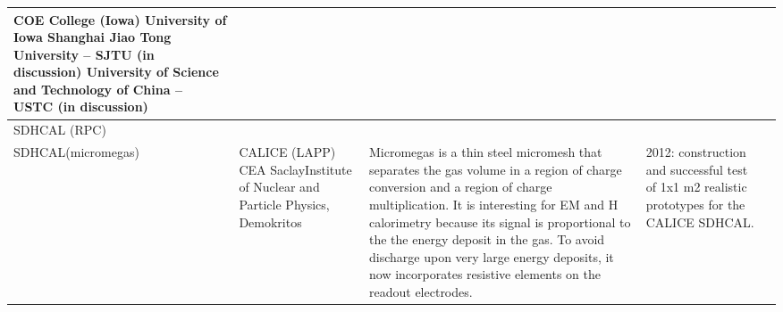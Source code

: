 \begin{landscape}
\begin{sidewaystable}
\begin{adjustbox}{max width=1.1\textwidth,totalheight=1\textheight}
\begin{tabularx}{2\textheight}{lXXXX}
    COE College (Iowa)                         \newline
    University of Iowa                                 \newline
    Shanghai Jiao Tong University -- SJTU (in discussion)      \newline
    University of Science and Technology of China -- USTC (in discussion) &
     &
     &                                                                                                                                                                                                                                   \\
     \midrule
    SDHCAL (RPC)                                                                                                   &                                                                                                                                         &                                                                                                                                                                                                                                                                                                                                                                                      &                                                                                                                                                                                                                                                                 &                                                                                                                                                                                                                                     \\
    \midrule
    SDHCAL(micromegas) &
     CALICE (LAPP) \newline CEA Saclay\newline Institute of Nuclear and Particle Physics, Demokritos                                                            &
      Micromegas is a thin steel micromesh that separates the gas volume in a region of charge conversion and a region of charge multiplication. It is interesting for EM and H calorimetry because its signal is proportional to the the energy deposit in the gas. To avoid discharge upon very large energy deposits, it now incorporates resistive elements on the readout electrodes. &
       2012: construction and successful test of 1x1 m2 realistic prototypes for the CALICE SDHCAL.\newline

\end{tabularx}
\end{adjustbox}
\end{sidewaystable}
\end{landscape}
